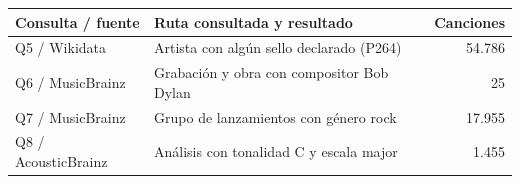 \begin{center}\small
{}\label{tab:evidencia_fuentes}
\begin{tabularx}{\linewidth}{@{}>{\raggedright\arraybackslash}p{3.6cm} Y r@{}}
\toprule
\textbf{Consulta / fuente} & \textbf{Ruta consultada y resultado} & \textbf{Canciones} \\
\midrule
Q5 / Wikidata & Artista con algún sello declarado (P264) & 54.786 \\
Q6 / MusicBrainz & Grabación y obra con compositor Bob Dylan & 25 \\
Q7 / MusicBrainz & Grupo de lanzamientos con género rock & 17.955 \\
Q8 / AcousticBrainz & Análisis con tonalidad C y escala major & 1.455 \\
\bottomrule
\end{tabularx}
\end{center}

